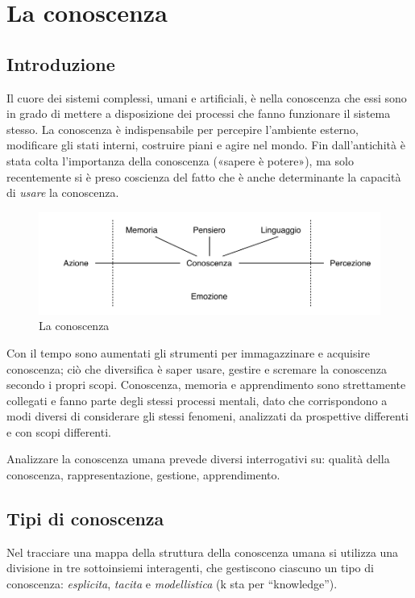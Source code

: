 \chapter{La conoscenza}
\section{Introduzione}
Il cuore dei sistemi complessi, umani e artificiali, è nella conoscenza che essi sono in grado di mettere a disposizione dei processi che fanno funzionare il sistema stesso. La conoscenza è indispensabile per percepire l’ambiente esterno, modificare gli stati interni, costruire piani e agire nel mondo. Fin dall’antichità è stata colta l’importanza della conoscenza («sapere è potere»), ma solo recentemente si è preso coscienza del fatto che è anche determinante la capacità di \emph{usare} la conoscenza.

\begin{figure}[hbt]
  \centering
  \includegraphics[width=\textwidth]{img/conoscenza.png}
  \caption{La conoscenza}
  \label{fig:conoscenza}
\end{figure}

Con il tempo sono aumentati gli strumenti per immagazzinare e acquisire conoscenza; ciò che diversifica è saper usare, gestire e scremare la conoscenza secondo i propri scopi. Conoscenza, memoria e apprendimento sono strettamente collegati e fanno parte degli stessi processi mentali, dato che corrispondono a modi diversi di considerare gli stessi fenomeni, analizzati da prospettive differenti e con scopi differenti.

Analizzare la conoscenza umana prevede diversi interrogativi su: qualità della conoscenza, rappresentazione, gestione, apprendimento.

\section{Tipi di conoscenza}
Nel tracciare una mappa della struttura della conoscenza umana si utilizza una divisione in tre sottoinsiemi interagenti, che gestiscono ciascuno un tipo di conoscenza: \emph{esplicita}, \emph{tacita} e \emph{modellistica} (k sta per ``knowledge'').

